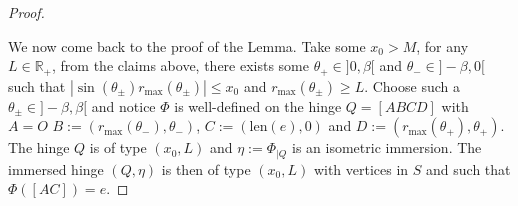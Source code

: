 \documentclass[a4paper,12pt]{article}
\def\RR{\mathbb{R}}
\theoremstyle{definition}
\begin{document}
\begin{proof}
\begin{center}
						\end{center}
					
				We now come back to the proof of the Lemma. Take some $x_0>M$, for any $L\in \RR_+$, from the claims above, there exists some $\theta_+\in]0,\beta[$ and $\theta_-\in ]-\beta,0[$ such that $|\sin(\theta_\pm)r_{\max}(\theta_\pm)| \leq x_0 $ and $r_{\max}(\theta_{\pm})\geq L$. Choose such a $\theta_\pm\in ]-\beta,\beta[$ and notice $\Phi$ is well-defined on the hinge
				$Q=[ABCD]$ with $A=O$ $B:=(r_{\max}(\theta_-),\theta_-)$, $C:=(\mathrm{len}(e),0)$ and $D:=(r_{\max}(\theta_+),\theta_+)$. The hinge $Q$ is of type $(x_0,L)$ and $\eta:= \Phi_{|Q}$ is an isometric immersion. The immersed hinge $(Q,\eta)$ is then of type $(x_0,L)$ with vertices in $S$ and such that $\Phi([AC])=e$.\end{proof}
\end{document}
